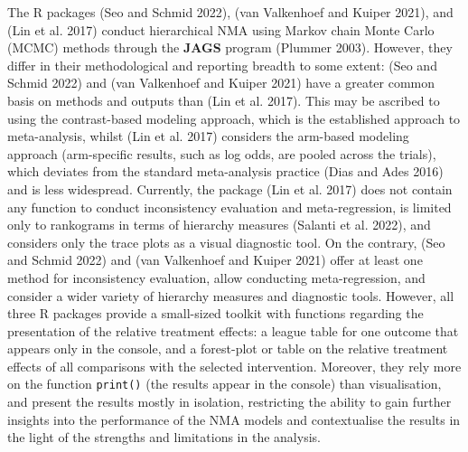 The R packages  (Seo and Schmid 2022),  (van Valkenhoef and Kuiper 2021), and 
(Lin et al. 2017) conduct hierarchical NMA using Markov chain Monte Carlo (MCMC) methods
through the \textbf{JAGS} program (Plummer 2003). However, they differ in their
methodological and reporting breadth to some extent:  (Seo and Schmid 2022)
and  (van Valkenhoef and Kuiper 2021) have a greater common basis on methods and outputs
than  (Lin et al. 2017). This may be ascribed to using the contrast-based
modeling approach, which is the established approach to meta-analysis, whilst
 (Lin et al. 2017) considers the arm-based modeling approach
(arm-specific results, such as log odds, are pooled across the trials), which
deviates from the standard meta-analysis practice (Dias and Ades 2016) and is less widespread.
Currently, the package  (Lin et al. 2017) does not contain any
function to conduct inconsistency evaluation and meta-regression, is limited only
to rankograms in terms of hierarchy measures (Salanti et al. 2022), and considers only
the trace plots as a visual diagnostic tool. On the contrary,  (Seo and Schmid 2022)
and  (van Valkenhoef and Kuiper 2021) offer at least one method for inconsistency evaluation,
allow conducting meta-regression, and consider a wider variety of hierarchy measures
and diagnostic tools. However, all three R packages provide a small-sized toolkit
with functions regarding the presentation of the relative treatment effects: a league
table for one outcome that appears only in the console, and a forest-plot or table
on the relative treatment effects of all comparisons with the selected intervention.
Moreover, they rely more on the function \texttt{print()} (the results appear in the
console) than visualisation, and present the results mostly in isolation, restricting
the ability to gain further insights into the performance of the NMA models and
contextualise the results in the light of the strengths and limitations in the analysis.

